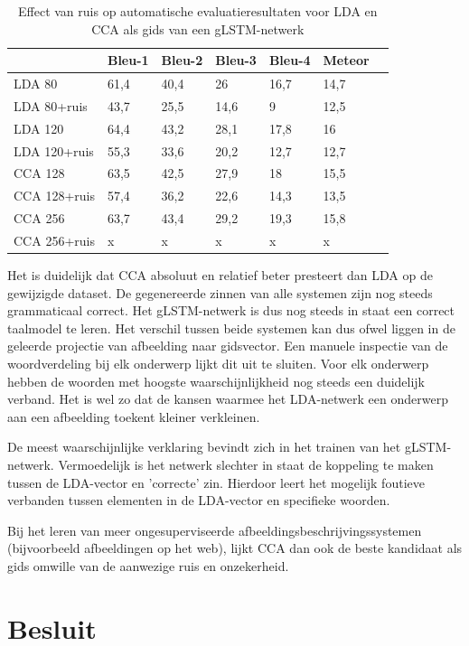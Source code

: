 \begin{table}
	\centering
	\begin{tabular}{lllllll}
		~                  & Bleu-1 & Bleu-2 & Bleu-3 & Bleu-4 & Meteor \\ \hline
		LDA 80        & 61,4   & 40,4 			& 26   & 16,7  & 14,7 \\
		LDA 80+ruis & 43,7  &25,5    &14,6   & 9   & 12,5 \\ \hline
		LDA 120   & 64,4   & 43,2   & 28,1   & 17,8 & 16 \\
		LDA 120+ruis   & 55,3   & 33,6   & 20,2   & 12,7 & 12,7 \\ \hline
		CCA 128   & 63,5   & 42,5   & 27,9   & 18 & 15,5 \\
		CCA 128+ruis   & 57,4   & 36,2   & 22,6   & 14,3 & 13,5 \\ \hline
		CCA 256   & 63,7   & 43,4   & 29,2   & 19,3 & 15,8 \\
		CCA 256+ruis   & x  & x   & x   & x & x \\ \hline			
	\end{tabular}
	\caption{Effect van ruis op automatische evaluatieresultaten voor LDA en CCA als gids van een gLSTM-netwerk}
	\label{table:ruis}
\end{table}

Het is duidelijk dat CCA absoluut en relatief beter presteert dan LDA op de gewijzigde dataset.
De gegenereerde zinnen van alle systemen zijn nog steeds grammaticaal correct.
Het gLSTM-netwerk is dus nog steeds in staat een correct taalmodel te leren.
Het verschil tussen beide systemen kan dus ofwel liggen in de geleerde projectie van afbeelding naar gidsvector.
Een manuele inspectie van de woordverdeling bij elk onderwerp lijkt dit uit te sluiten.
Voor elk onderwerp hebben de woorden met hoogste waarschijnlijkheid nog steeds een duidelijk verband.
Het is wel zo dat de kansen waarmee het LDA-netwerk een onderwerp aan een afbeelding toekent kleiner verkleinen.

De meest waarschijnlijke verklaring bevindt zich in het trainen van het gLSTM-netwerk.
Vermoedelijk is het netwerk slechter in staat de koppeling te maken tussen de LDA-vector en 'correcte' zin. 
Hierdoor leert het mogelijk foutieve verbanden tussen elementen in de LDA-vector en specifieke woorden.
	
Bij het leren van meer ongesuperviseerde afbeeldingsbeschrijvingssystemen (bijvoorbeeld afbeeldingen op het web), lijkt CCA dan ook de beste kandidaat als gids omwille van de aanwezige ruis en onzekerheid. 

\section{Besluit} %
\label{sec:besluit}


